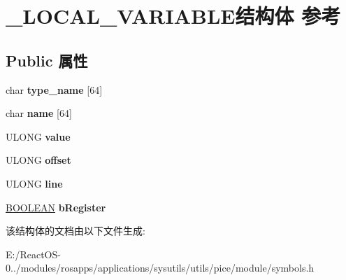 \hypertarget{struct___l_o_c_a_l___v_a_r_i_a_b_l_e}{}\section{\+\_\+\+L\+O\+C\+A\+L\+\_\+\+V\+A\+R\+I\+A\+B\+L\+E结构体 参考}
\label{struct___l_o_c_a_l___v_a_r_i_a_b_l_e}
\subsection*{Public 属性}
\begin{DoxyCompactItemize}
\item 
\mbox{\label{struct___l_o_c_a_l___v_a_r_i_a_b_l_e_a3bc60590597d69c6934fd3c78d9e1299}} 
char {\bfseries type\+\_\+name} \mbox{[}64\mbox{]}
\item 
\mbox{\label{struct___l_o_c_a_l___v_a_r_i_a_b_l_e_a308f6a538635e75553a00b456c53ea7c}} 
char {\bfseries name} \mbox{[}64\mbox{]}
\item 
\mbox{\label{struct___l_o_c_a_l___v_a_r_i_a_b_l_e_acfb46e68547f56ca1ba2fec1115c7fcd}} 
U\+L\+O\+NG {\bfseries value}
\item 
\mbox{\label{struct___l_o_c_a_l___v_a_r_i_a_b_l_e_a1334a21bd380bd2a0d36609ff1052005}} 
U\+L\+O\+NG {\bfseries offset}
\item 
\mbox{\label{struct___l_o_c_a_l___v_a_r_i_a_b_l_e_a9a820eaa48a67c9222ffeb4c102fe489}} 
U\+L\+O\+NG {\bfseries line}
\item 
\mbox{\label{struct___l_o_c_a_l___v_a_r_i_a_b_l_e_a1fac14b7232dd740c4d3b20be6a5734f}} 
\hyperlink{_processor_bind_8h_a112e3146cb38b6ee95e64d85842e380a}{B\+O\+O\+L\+E\+AN} {\bfseries b\+Register}
\end{DoxyCompactItemize}


该结构体的文档由以下文件生成\+:\begin{DoxyCompactItemize}
\item 
E\+:/\+React\+O\+S-\/0../modules/rosapps/applications/sysutils/utils/pice/module/symbols.\+h\end{DoxyCompactItemize}
